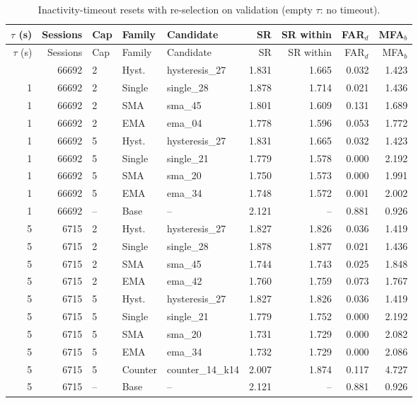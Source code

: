{\footnotesize\setlength{\tabcolsep}{4pt}
\begin{longtable}{rrlllrrrr}
\caption{Inactivity-timeout resets with re-selection on validation (empty $\tau$: no timeout).}\label{tab:s7_timeout}\\
\toprule
$\tau$ (s) & Sessions & Cap & Family & Candidate & SR & SR within & FAR$_d$ & MFA$_b$\\
\midrule
\endfirsthead
\toprule
$\tau$ (s) & Sessions & Cap & Family & Candidate & SR & SR within & FAR$_d$ & MFA$_b$\\
\midrule
\endhead
\bottomrule
\endfoot
1 & 66692 & 2 & Hyst. & hysteresis\_27 & 1.831 & 1.665 & 0.032 & 1.423\\
1 & 66692 & 2 & Single & single\_28 & 1.878 & 1.714 & 0.021 & 1.436\\
1 & 66692 & 2 & SMA & sma\_45 & 1.801 & 1.609 & 0.131 & 1.689\\
1 & 66692 & 2 & EMA & ema\_04 & 1.778 & 1.596 & 0.053 & 1.772\\
1 & 66692 & 5 & Hyst. & hysteresis\_27 & 1.831 & 1.665 & 0.032 & 1.423\\
1 & 66692 & 5 & Single & single\_21 & 1.779 & 1.578 & 0.000 & 2.192\\
1 & 66692 & 5 & SMA & sma\_20 & 1.750 & 1.573 & 0.000 & 1.991\\
1 & 66692 & 5 & EMA & ema\_34 & 1.748 & 1.572 & 0.001 & 2.002\\
1 & 66692 & -- & Base & -- & 2.121 & -- & 0.881 & 0.926\\
5 & 6715 & 2 & Hyst. & hysteresis\_27 & 1.827 & 1.826 & 0.036 & 1.419\\
5 & 6715 & 2 & Single & single\_28 & 1.878 & 1.877 & 0.021 & 1.436\\
5 & 6715 & 2 & SMA & sma\_45 & 1.744 & 1.743 & 0.025 & 1.848\\
5 & 6715 & 2 & EMA & ema\_42 & 1.760 & 1.759 & 0.073 & 1.767\\
5 & 6715 & 5 & Hyst. & hysteresis\_27 & 1.827 & 1.826 & 0.036 & 1.419\\
5 & 6715 & 5 & Single & single\_21 & 1.779 & 1.752 & 0.000 & 2.192\\
5 & 6715 & 5 & SMA & sma\_20 & 1.731 & 1.729 & 0.000 & 2.082\\
5 & 6715 & 5 & EMA & ema\_34 & 1.732 & 1.729 & 0.000 & 2.086\\
5 & 6715 & 5 & Counter & counter\_14\_k14 & 2.007 & 1.874 & 0.117 & 4.727\\
5 & 6715 & -- & Base & -- & 2.121 & -- & 0.881 & 0.926\\

\end{longtable}}
